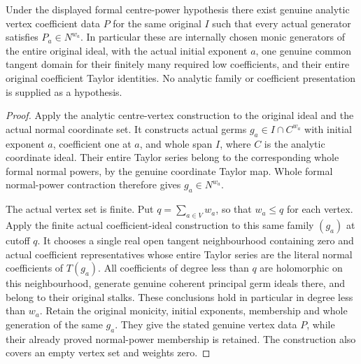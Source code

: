 \begin{theorem}
\label{hir:actual-reduced-centre-compatible-analytic-vertex-data}
\leanok
Under the displayed formal centre-power hypothesis there exist genuine
analytic vertex coefficient data $P$ for the same original $I$ such
that every actual generator satisfies $P_a\in N^{w_a}$. In particular
these are internally chosen monic generators of the entire original
ideal, with the actual initial exponent $a$, one genuine common tangent
domain for their finitely many required low coefficients, and their
entire original coefficient Taylor identities. No analytic family or
coefficient presentation is supplied as a hypothesis.
\end{theorem}
\begin{proof}
Apply the analytic centre-vertex construction to the original ideal
and the actual normal coordinate set. It constructs actual germs
$g_a\in I\cap C^{w_a}$ with initial exponent $a$, coefficient one at
$a$, and whole span $I$, where $C$ is the analytic coordinate ideal.
Their entire Taylor series belong to the corresponding whole formal
normal powers, by the genuine coordinate Taylor map. Whole formal
normal-power contraction therefore gives $g_a\in N^{w_a}$.

The actual vertex set is finite. Put $q=\sum_{a\in V}w_a$, so that
$w_a\le q$ for each vertex. Apply the finite actual coefficient-ideal
construction to this same family $(g_a)$ at cutoff $q$. It chooses a
single real open tangent neighbourhood containing zero and actual
coefficient representatives whose entire Taylor series are the literal
normal coefficients of $T(g_a)$. All coefficients of degree less than
$q$ are holomorphic on this neighbourhood, generate genuine coherent
principal germ ideals there, and belong to their original stalks.
These conclusions hold in particular in degree less than $w_a$.
Retain the original monicity, initial exponents, membership and whole
generation of the same $g_a$. They give the stated genuine vertex data
$P$, while their already proved normal-power membership is retained.
The construction also covers an empty vertex set and weights zero.
\end{proof}

